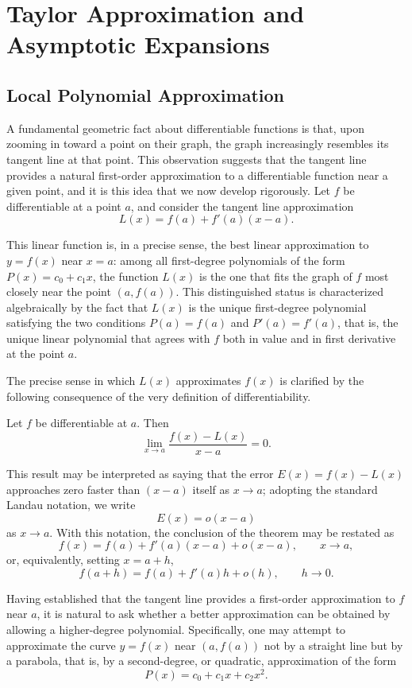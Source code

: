 \section{Taylor Approximation and Asymptotic Expansions}

\subsection{Local Polynomial Approximation}

A fundamental geometric fact about differentiable functions is that, upon zooming in toward a point on their graph, the graph increasingly resembles its tangent line at that point. This observation suggests that the tangent line provides a natural first-order approximation to a differentiable function near a given point, and it is this idea that we now develop rigorously. Let $f$ be differentiable at a point $a$, and consider the tangent line approximation
\[
L(x) = f(a) + f'(a)(x-a).
\]

This linear function is, in a precise sense, the best linear approximation to $y = f(x)$ near $x = a$: among all first-degree polynomials of the form $P(x) = c_0 + c_1 x$, the function $L(x)$ is the one that fits the graph of $f$ most closely near the point $(a, f(a))$. This distinguished status is characterized algebraically by the fact that $L(x)$ is the unique first-degree polynomial satisfying the two conditions $P(a) = f(a)$ and $P'(a) = f'(a)$, that is, the unique linear polynomial that agrees with $f$ both in value and in first derivative at the point $a$.

The precise sense in which $L(x)$ approximates $f(x)$ is clarified by the following consequence of the very definition of differentiability.

\begin{theorem}
Let $f$ be differentiable at $a$. Then
\[
\lim_{x \to a} \frac{f(x) - L(x)}{x - a} = 0.
\]

\end{theorem}

This result may be interpreted as saying that the error $E(x) = f(x) - L(x)$ approaches zero faster than $(x-a)$ itself as $x \to a$; adopting the standard Landau notation, we write
\[
E(x) = o(x-a)
\]
 as $x \to a$. With this notation, the conclusion of the theorem may be restated as
\[
f(x) = f(a) + f'(a)(x-a) + o(x-a), \qquad x \to a,
\] or, equivalently, setting $x = a + h$,
\[
f(a+h) = f(a) + f'(a) h + o(h), \qquad h \to 0.
\]

Having established that the tangent line provides a first-order approximation to $f$ near $a$, it is natural to ask whether a better approximation can be obtained by allowing a higher-degree polynomial. Specifically, one may attempt to approximate the curve $y = f(x)$ near $(a, f(a))$ not by a straight line but by a parabola, that is, by a second-degree, or quadratic, approximation of the form
\[
P(x) = c_0 + c_1 x + c_2 x^2.
\]

